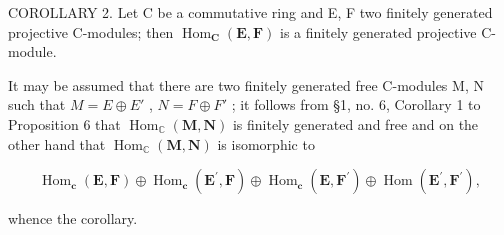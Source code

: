 COROLLARY 2. Let C be a commutative ring and E, F two finitely generated projective C-modules; then \(\operatorname{Hom}_{\mathbf{C}}(\mathbf{E}, \mathbf{F})\) is a finitely generated projective C-module.

It may be assumed that there are two finitely generated free C-modules M, N such that \(M = E \oplus E'\) , \(N = F \oplus F'\) ; it follows from §1, no. 6, Corollary 1 to Proposition 6 that \(\operatorname{Hom}_{\mathbb{C}}(\mathbf{M}, \mathbf{N})\) is finitely generated and free and on the other hand that \(\operatorname{Hom}_{\mathbb{C}}(\mathbf{M}, \mathbf{N})\) is isomorphic to

\[
\operatorname{Hom} _ {\mathbf {c}} (\mathbf {E}, \mathbf {F}) \oplus \operatorname{Hom} _ {\mathbf {c}} (\mathbf {E} ^ {\prime}, \mathbf {F}) \oplus \operatorname{Hom} _ {\mathbf {c}} (\mathbf {E}, \mathbf {F} ^ {\prime}) \oplus \operatorname{Hom} (\mathbf {E} ^ {\prime}, \mathbf {F} ^ {\prime}),
\]

whence the corollary.

